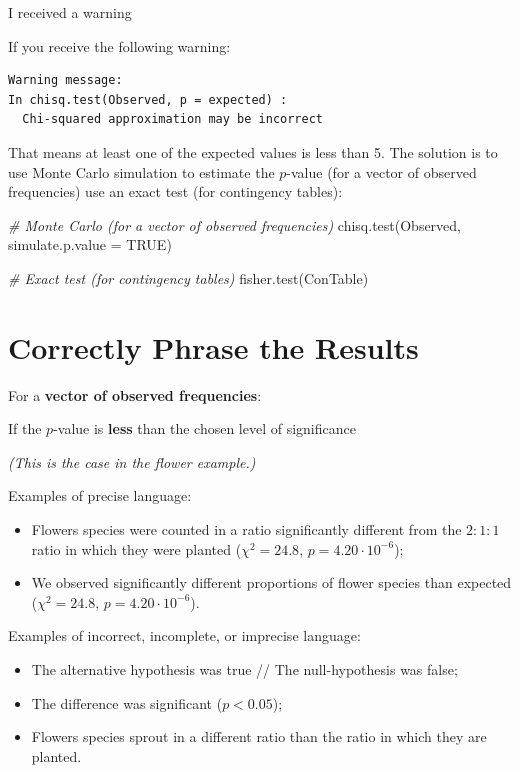 \documentclass[
]{book}
\newenvironment{Shaded}{\begin{snugshade}}{\end{snugshade}}
\newcommand{\AttributeTok}[1]{\textcolor[rgb]{0.77,0.63,0.00}{#1}}
\newcommand{\CommentTok}[1]{\textcolor[rgb]{0.56,0.35,0.01}{\textit{#1}}}
\newcommand{\ConstantTok}[1]{\textcolor[rgb]{0.00,0.00,0.00}{#1}}
\newcommand{\FunctionTok}[1]{\textcolor[rgb]{0.00,0.00,0.00}{#1}}
\newcommand{\NormalTok}[1]{#1}
\providecommand{\tightlist}{%
  \setlength{\itemsep}{0pt}\setlength{\parskip}{0pt}}
\begin{document}
I received a warning

If you receive the following warning:

\begin{verbatim}
Warning message:
In chisq.test(Observed, p = expected) :
  Chi-squared approximation may be incorrect
\end{verbatim}

That means at least one of the expected values is less than 5. The solution is to use Monte Carlo simulation to estimate the \(p\)-value (for a vector of observed frequencies) use an exact test (for contingency tables):

\begin{Shaded}
\begin{Highlighting}[]
\CommentTok{\# Monte Carlo (for a vector of observed frequencies)}
\FunctionTok{chisq.test}\NormalTok{(Observed, }\AttributeTok{simulate.p.value =} \ConstantTok{TRUE}\NormalTok{)}

\CommentTok{\# Exact test (for contingency tables)}
\FunctionTok{fisher.test}\NormalTok{(ConTable)}
\end{Highlighting}
\end{Shaded}

\hypertarget{results-chi}{%
\section{Correctly Phrase the Results}\label{results-chi}}

For a \textbf{vector of observed frequencies}:

If the \(p\)-value is \textbf{less} than the chosen level of significance

\emph{(This is the case in the flower example.)}

Examples of precise language:

\begin{itemize}
\tightlist
\item
  Flowers species were counted in a ratio significantly different from the \(2:1:1\) ratio in which they were planted (\(\chi^2 = 24.8\), \(p = 4.20 \cdot 10^{-6}\));
\item
  We observed significantly different proportions of flower species than expected (\(\chi^2 = 24.8\), \(p = 4.20 \cdot 10^{-6}\)).
\end{itemize}

Examples of incorrect, incomplete, or imprecise language:

\begin{itemize}
\tightlist
\item
  The alternative hypothesis was true // The null-hypothesis was false;
\item
  The difference was significant (\(p < 0.05\));
\item
  Flowers species sprout in a different ratio than the ratio in which they are planted.
\end{itemize}
\end{document}
